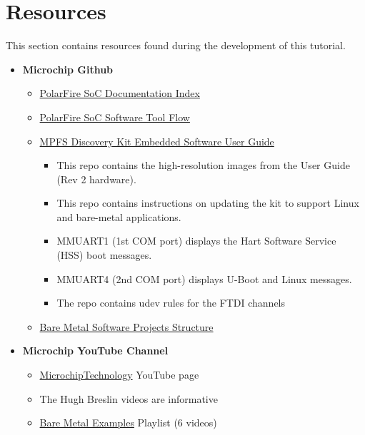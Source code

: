 \section{Resources}
\label{sec:resources}

This section contains resources found during the development of this tutorial.

\begin{itemize}
\item \textbf{Microchip Github}
%
\begin{itemize}
\item
\href{https://github.com/polarfire-soc/polarfire-soc-documentation/blob/master/README.md}
{PolarFire SoC Documentation Index}
%
\item
\href{https://github.com/polarfire-soc/polarfire-soc-documentation/blob/master/knowledge-base/polarfire-soc-software-tool-flow.md}
{PolarFire SoC Software Tool Flow}
%
\item
\href{https://github.com/polarfire-soc/polarfire-soc-documentation/blob/master/reference-designs-fpga-and-development-kits/mpfs-discovery-kit-embedded-software-user-guide.md}
{MPFS Discovery Kit Embedded Software User Guide}
%
\begin{itemize}
\item
This repo contains the high-resolution images from the User Guide (Rev 2 hardware).
\item
This repo contains instructions on updating the kit to support Linux and bare-metal applications.
\item
MMUART1 (1st COM port) displays the Hart Software Service (HSS) boot messages.
\item
MMUART4 (2nd COM port) displays U-Boot and Linux messages.
\item
The repo contains udev rules for the FTDI channels
\end{itemize}
%
\item
\href{https://github.com/polarfire-soc/polarfire-soc-documentation/blob/master/bare-metal-embedded-software/bare-metal-software-project-structure.md}
{Bare Metal Software Projects Structure}
%
\end{itemize}
%
\item \textbf{Microchip YouTube Channel}
%
\begin{itemize}
\item \href{https://www.youtube.com/user/MicrochipTechnology}{MicrochipTechnology} YouTube page
\item The Hugh Breslin videos are informative
\item
\href{https://www.youtube.com/playlist?list=PLtQdQmNK_0DSh2Mr18m8BNYRTK3sxeAPX}
{Bare Metal Examples} Playlist (6 videos)
\end{itemize}


\end{itemize}

